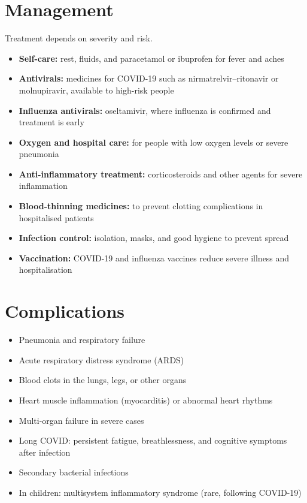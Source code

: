 \section*{Management}
Treatment depends on severity and risk.

\begin{itemize}
    \item \textbf{Self-care:} rest, fluids, and paracetamol or ibuprofen for fever and aches
    \item \textbf{Antivirals:} medicines for COVID-19 such as nirmatrelvir--ritonavir or molnupiravir, available to high-risk people
    \item \textbf{Influenza antivirals:} oseltamivir, where influenza is confirmed and treatment is early
    \item \textbf{Oxygen and hospital care:} for people with low oxygen levels or severe pneumonia
    \item \textbf{Anti-inflammatory treatment:} corticosteroids and other agents for severe inflammation
    \item \textbf{Blood-thinning medicines:} to prevent clotting complications in hospitalised patients
    \item \textbf{Infection control:} isolation, masks, and good hygiene to prevent spread
    \item \textbf{Vaccination:} COVID-19 and influenza vaccines reduce severe illness and hospitalisation
\end{itemize}

\section*{Complications}
\begin{itemize}
    \item Pneumonia and respiratory failure
    \item Acute respiratory distress syndrome (ARDS)
    \item Blood clots in the lungs, legs, or other organs
    \item Heart muscle inflammation (myocarditis) or abnormal heart rhythms
    \item Multi-organ failure in severe cases
    \item Long COVID: persistent fatigue, breathlessness, and cognitive symptoms after infection
    \item Secondary bacterial infections
    \item In children: multisystem inflammatory syndrome (rare, following COVID-19)
\end{itemize}

